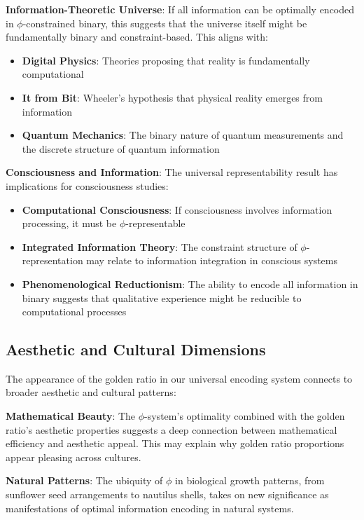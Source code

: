 \documentclass[12pt,letterpaper]{article}
\begin{document}
\textbf{Information-Theoretic Universe}: If all information can be optimally encoded in $\phi$-constrained binary, this suggests that the universe itself might be fundamentally binary and constraint-based. This aligns with:

\begin{itemize}
\item \textbf{Digital Physics}: Theories proposing that reality is fundamentally computational
\item \textbf{It from Bit}: Wheeler's hypothesis that physical reality emerges from information
\item \textbf{Quantum Mechanics}: The binary nature of quantum measurements and the discrete structure of quantum information
\end{itemize}

\textbf{Consciousness and Information}: The universal representability result has implications for consciousness studies:

\begin{itemize}
\item \textbf{Computational Consciousness}: If consciousness involves information processing, it must be $\phi$-representable
\item \textbf{Integrated Information Theory}: The constraint structure of $\phi$-representation may relate to information integration in conscious systems
\item \textbf{Phenomenological Reductionism}: The ability to encode all information in binary suggests that qualitative experience might be reducible to computational processes
\end{itemize}

\subsection{Aesthetic and Cultural Dimensions}

The appearance of the golden ratio in our universal encoding system connects to broader aesthetic and cultural patterns:

\textbf{Mathematical Beauty}: The $\phi$-system's optimality combined with the golden ratio's aesthetic properties suggests a deep connection between mathematical efficiency and aesthetic appeal. This may explain why golden ratio proportions appear pleasing across cultures.

\textbf{Natural Patterns}: The ubiquity of $\phi$ in biological growth patterns, from sunflower seed arrangements to nautilus shells, takes on new significance as manifestations of optimal information encoding in natural systems.
\end{document}
